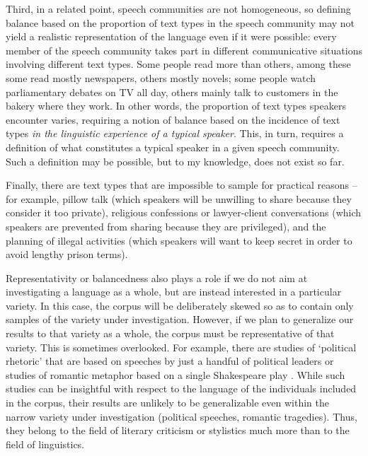 Third, in a related point, speech communities are not homogeneous, so defining balance based on the proportion of text types in the speech community may not yield a realistic representation of the language even if it were possible: every member of the speech community takes part in different communicative situations involving different text types. Some people read more than others, among these some read mostly newspapers, others mostly novels; some people watch parliamentary debates on TV all day, others mainly talk to customers in the bakery where they work. In other words, the proportion of text types speakers encounter varies, requiring a notion of balance based on the incidence of text types \emph{in the linguistic experience of a typical speaker}. This, in turn, requires a definition of what constitutes a typical speaker in a given speech community. Such a definition may be possible, but to my knowledge, does not exist so far.

Finally, there are text types that are impossible to sample for practical reasons -- for example, pillow talk (which speakers will be unwilling to share because they consider it too private), religious confessions or lawyer-client conversations (which speakers are prevented from sharing because they are privileged), and the planning of illegal activities (which speakers will want to keep secret in order to avoid lengthy prison terms).

Representativity or balancedness also plays a role if we do not aim at investigating a language as a whole, but are instead interested in a particular variety. In this case, the corpus will be deliberately skewed so as to contain only samples of the variety under investigation. However, if we plan to generalize our results to that variety as a whole, the corpus must be representative of that variety. This is sometimes overlooked. For example, there are studies of `political rhetoric' that are based on speeches by just a handful of political leaders \citep[cf., e.g.,][]{charteris-black_britain_2006,charteris-black_politicians_2005} or studies of romantic metaphor based on a single Shakespeare play \citep{barcelona_sanchez_metaphorical_1995}. While such studies can be insightful with respect to the language of the individuals included in the corpus, their results are unlikely to be generalizable even within the narrow variety under investigation (political speeches, romantic tragedies). Thus, they belong to the field of literary criticism or stylistics much more than to the field of linguistics.

